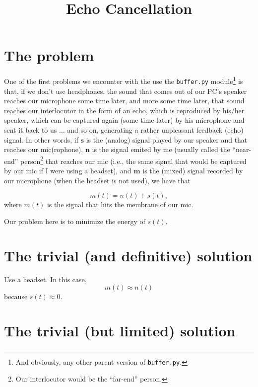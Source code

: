 
\title{Echo Cancellation}

\maketitle


\section{The problem}

One of the first problems we encounter with the use the
\texttt{buffer.py} module\footnote{And obviously, any other parent
  version of \texttt{buffer.py}.} is that, if we don't use headphones,
the sound that comes out of our PC's speaker reaches our microphone
some time later, and more some time later, that sound reaches our
interlocutor in the form of an echo, which is reproduced by his/her
speaker, which can be captured again (some time later) by his
microphone and sent it back to us ... and so on, generating a rather
unpleasant feedback (echo) signal. In other words, if ${\mathbf s}$ is
the (analog) signal played by our speaker and that reaches our
mic(rophone), ${\mathbf n}$ is the signal emited by me (usually called
the ``near-end'' person\footnote{Our interlocutor would be the
  ``far-end'' person.} that reaches our mic (i.e., the same signal
that would be captured by our mic if I were using a headset), and
${\mathbf m}$ is the (mixed) signal recorded by our microphone (when
the headset is not used), we have that

\begin{equation}
  m(t) = n(t) + s(t),
  \label{eq:echo_problem}
\end{equation}
where $m(t)$ is the signal that hits the membrane of our mic.

Our problem here is to minimize the energy of $s(t)$.

\section{The trivial (and definitive) solution}

Use a headset. In this case,
\begin{equation}
  m(t) \approx n(t)
  \label{eq:headset_solution}
\end{equation}
because $s(t)\approx 0$.

\section{The trivial (but limited) solution}

